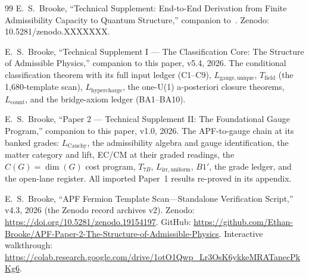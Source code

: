 \documentclass[11pt]{article}
\begin{document}
\begin{thebibliography}{99}
 E.~S.~Brooke, ``Technical Supplement: End-to-End Derivation from Finite Admissibility Capacity to Quantum Structure,'' companion to~\cite{BrookePaper1}.  Zenodo: 10.5281/zenodo.XXXXXXX.

 E.~S.~Brooke, ``Technical Supplement I --- The Classification Core: The Structure of Admissible Physics,'' companion to this paper, v5.4, 2026.  The conditional classification theorem with its full input ledger (C1--C9), $L_{\mathrm{gauge,unique}}$, $T_{\mathrm{field}}$ (the 1{,}680-template scan), $L_{\mathrm{hypercharge}}$, the one-U(1) a-posteriori closure theorems, $L_{\mathrm{count}}$, and the bridge-axiom ledger (BA1--BA10).

 E.~S.~Brooke, ``Paper 2 --- Technical Supplement II: The Foundational Gauge Program,'' companion to this paper, v1.0, 2026.  The APF-to-gauge chain at its banked grades: $L_{\mathrm{Cauchy}}$, the admissibility algebra and gauge identification, the matter category and lift, EC/CM at their graded readings, the $C(G) = \dim(G)$ cost program, $T_{7B}$, $L_{\mathrm{irr,uniform}}$, $B1'$, the grade ledger, and the open-lane register.  All imported Paper~1 results re-proved in its appendix.

 E.~S.~Brooke, ``APF Fermion Template Scan---Standalone Verification Script,'' v4.3, 2026 (the Zenodo record archives v2).  Zenodo: \url{https://doi.org/10.5281/zenodo.19154197}.  GitHub: \url{https://github.com/Ethan-Brooke/APF-Paper-2-The-Structure-of-Admissible-Physics}.  Interactive walkthrough: \url{https://colab.research.google.com/drive/1otO1Qwp_Lr3OsK6ykkeMRATanecPkKg6}.

\end{thebibliography}
\end{document}
